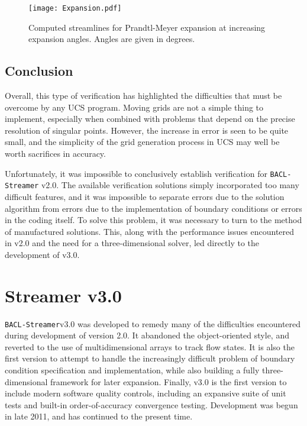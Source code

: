 \begin{figure}[p]
  \centering
  \texttt{[image: Expansion.pdf]} 
  \caption{Computed streamlines for Prandtl-Meyer expansion at increasing expansion angles. Angles are given in degrees. }
  \label{fig:expansion-separation}
\end{figure}

\subsection{Conclusion}
Overall, this type of verification has highlighted the difficulties that must be overcome by any UCS program. Moving grids are not a simple thing to implement, especially when combined with problems that depend on the precise resolution of singular points. However, the increase in error is seen to be quite small, and the simplicity of the grid generation process in UCS may well be worth sacrifices in accuracy.

Unfortunately, it was impossible to conclusively establish verification for {\tt BACL-Streamer} v2.0. The available verification solutions simply incorporated too many difficult features, and it was impossible to separate errors due to the solution algorithm from errors due to the implementation of boundary conditions or errors in the coding itself. To solve this problem, it was necessary to turn to the method of manufactured solutions. This, along with the performance issues encountered in v2.0 and the need for a three-dimensional solver, led directly to the development of v3.0.

\section{Streamer v3.0}
\label{sec:ver-Streamer3}

{\tt BACL-Streamer}v3.0 was developed to remedy many of the difficulties encountered during development of version 2.0. It abandoned the object-oriented style, and reverted to the use of multidimensional arrays to track flow states. It is also the first version to attempt to handle the increasingly difficult problem of boundary condition specification and implementation, while also building a fully three-dimensional framework for later expansion. Finally, v3.0 is the first version to include modern software quality controls, including an expansive suite of unit tests and built-in order-of-accuracy convergence testing. Development was begun in late 2011, and has continued to the present time. 


